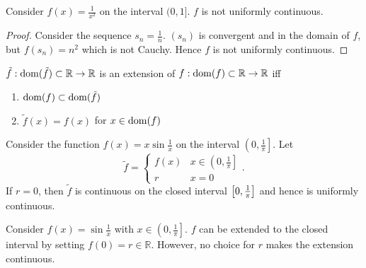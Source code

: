 \documentclass[../notes.tex]{subfiles}
\begin{document}
\begin{example}
    Consider $f(x) = \frac{1}{x^2}$ on the interval $(0, 1]$. $f$ is not uniformly continuous.
    \begin{proof}
        Consider the sequence $s_n = \frac{1}{n}$. $(s_n)$ is convergent and in the domain of $f$, but $f(s_n) = n^2$ which is not Cauchy. Hence $f$ is not uniformly continuous.
    \end{proof}
\end{example}

\begin{definition}
    $\tilde{f} : \operatorname{dom}(\tilde{f}) \subset \mathbb{R} \to \mathbb{R}$ is an extension of $f : \operatorname{dom}(f) \subset \mathbb{R} \to \mathbb{R}$ iff
    \begin{enumerate}
        \item $\operatorname{dom} (f) \subset \operatorname{dom}(\tilde{f})$
        \item $\tilde{f}(x) = f(x)$ for $x \in \operatorname{dom}(f)$
    \end{enumerate}
\end{definition}

\begin{example}
    Consider the function $f(x) = x \sin \frac{1}{x}$ on the interval $\left(0, \frac{1}{\pi}\right]$. Let
    \[
        \tilde{f} = \begin{cases}
            f(x) & x \in \left(0, \frac{1}{\pi}\right] \\
            r & x = 0
        \end{cases}
    .\]
    If $r = 0$, then $\tilde{f}$ is continuous on the closed interval $\qty[0, \frac{1}{\pi}]$ and hence is uniformly continuous.
\end{example}

\begin{example}
    Consider $f(x) = \sin \frac{1}{x}$ with $x \in \left(0, \frac{1}{\pi}\right]$. $f$ can be extended to the closed interval by setting $f(0) = r \in \mathbb{R}$. However, no choice for $r$ makes the extension continuous.
\end{example}
\end{document}
